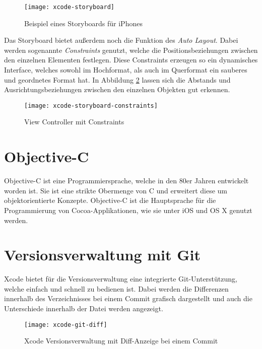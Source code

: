 \begin{figure}[htb!]
	\centering
	\texttt{[image: xcode-storyboard]}
	\caption{Beispiel eines Storyboards für iPhones}
	\label{xcode-storyboard}
\end{figure}

Das Storyboard bietet außerdem noch die Funktion des \emph{Auto Layout}. Dabei werden sogenannte \emph{Constraints} genutzt, welche die Positionsbeziehungen zwischen den einzelnen Elementen festlegen. Diese Constraints erzeugen so ein dynamisches Interface, welches sowohl im Hochformat, als auch im Querformat ein sauberes und geordnetes Format hat.
In Abbildung \ref{xcode-storyboard-constraints} lassen sich die Abstands und Ausrichtungsbeziehungen zwischen den einzelnen Objekten gut erkennen.

\begin{figure}[htb!]
		\centering
	\texttt{[image: xcode-storyboard-constraints]}
	\caption{View Controller mit Constraints}
	\label{xcode-storyboard-constraints}
\end{figure}

\section{Objective-C}
\label{sec:tools:objectivec}
Objective-C ist eine Programmiersprache, welche in den 80er Jahren entwickelt worden ist. Sie ist eine strikte Obermenge von C und erweitert diese um objektorientierte Konzepte. Objective-C ist die Hauptsprache für die Programmierung von Cocoa-Applikationen, wie sie unter iOS und OS X genutzt werden.



\section{Versionsverwaltung mit Git}
\label{sec:tools:git}
Xcode bietet für die Versionsverwaltung eine integrierte Git-Unterstützung, welche einfach und schnell zu bedienen ist.
Dabei werden die Differenzen innerhalb des Verzeichnisses bei einem Commit grafisch dargestellt und auch die Unterschiede innerhalb der Datei werden angezeigt.

\begin{figure}[htb!]
		  \centering
	\texttt{[image: xcode-git-diff]}
	\caption{Xcode Versionsverwaltung mit Diff-Anzeige bei einem Commit}
	\label{xcode-git-diff}
\end{figure}

